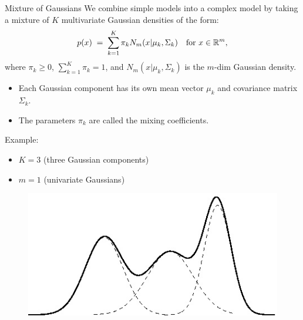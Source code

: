 \documentclass[11pt,handout,aspectratio=169]{beamer}
\begin{document}
\begin{frame}{Mixture of Gaussians}
We combine simple models into a complex model by taking a mixture of $K$ multivariate Gaussian densities of the form:
$$
p(x)\;=\;\sum_{k=1}^K \pi_k N_m(x|\mu_k,\Sigma_k)\quad\mbox{for }x\in \mathbb R^m,
$$
where $\pi_k\geq 0$, $\sum_{k=1}^K\pi_k=1$, and $N_m(x|\mu_k,\Sigma_k)$ is the $m$-dim Gaussian density.
\begin{itemize}
	\item Each Gaussian component has its own mean vector $\mu_k$ and covariance matrix $\Sigma_k$.
	\item The parameters $\pi_k$ are called the mixing coefficients.
\end{itemize}
\pause
\begin{minipage}{7cm}{}
Example:
\begin{itemize}
	\item $K=3$ (three Gaussian components)
	\item $m=1$ (univariate Gaussians)
\end{itemize}
\end{minipage}\begin{minipage}{5cm}{}
	\begin{figure}
\includegraphics[scale=.25]{./pics/multimodal.jpg}
\end{figure}
\end{minipage}
\end{frame}
\end{document}
